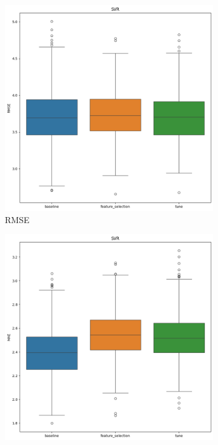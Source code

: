 \documentclass[12pt]{article}
\begin{document}
\begin{figure}[H]
    \centering
    \begin{subfigure}{0.3\textwidth}
        \centering
        \includegraphics[width=\linewidth]{ims/svr_rmse.png}
        \caption{RMSE}
        \label{fig:svr_rmse}
    \end{subfigure}
    \begin{subfigure}{0.3\textwidth}
        \centering
        \includegraphics[width=\linewidth]{ims/svr_mae.png}

\end{subfigure}
\end{figure}
\end{document}
